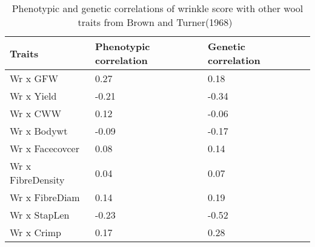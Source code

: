 %

\begin{table}[h]
\centering
\caption{Phenotypic and genetic correlations of wrinkle score with other wool traits from Brown and Turner(1968)~\cite{brow:68}}
\label{tab:bt68}
\vspace{0.1in}
\begin{tabular}{|p{1.2in}|p{0.8in}|p{0.8in}|p{0.8in}|}  \hline
  Traits  & Phenotypic correlation  & Genetic correlation  \\  \hline
 Wr x GFW  & 0.27 & 0.18  \\
 Wr x Yield & -0.21 & -0.34 \\
 Wr x CWW & 0.12 & -0.06 \\
 Wr x Bodywt & -0.09 & -0.17 \\
 Wr x Facecovcer & 0.08 &0.14 \\
 Wr x FibreDensity & 0.04 & 0.07 \\
 Wr x FibreDiam & 0.14 & 0.19 \\
 Wr x StapLen &  -0.23 & -0.52 \\
 Wr x Crimp & 0.17 & 0.28 \\ \hline
\end{tabular}
\end{table}

%
